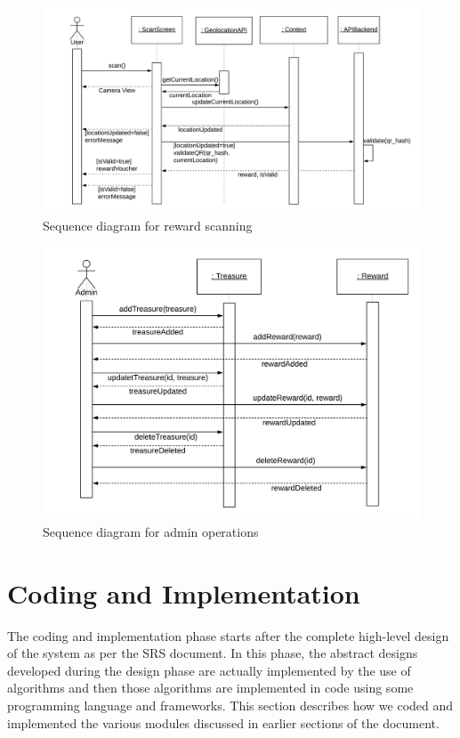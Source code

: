 \documentclass[12pt, a4paper, oneside]{article}
\begin{document}
\begin{figure}[H]
\includegraphics[width=\linewidth, keepaspectratio]{sequence-diagrams/reward-scan.png}
\centering
\caption{Sequence diagram for reward scanning}
\label{fig:reward-scan-sequence}
\end{figure}

\begin{figure}[H]
\includegraphics[width=\linewidth, keepaspectratio]{sequence-diagrams/admin-operations.png}
\centering
\caption{Sequence diagram for admin operations}
\label{fig:admin-operations-sequence}
\end{figure}

\pagebreak
\section{Coding and Implementation}
The coding and implementation phase starts after the complete high-level design of the system as per the SRS document. In this phase, the abstract designs developed during the design phase are actually implemented by the use of algorithms and then those algorithms are implemented in code using some programming language and frameworks. This section describes how we coded and implemented the various modules discussed in earlier sections of the document.
\end{document}

